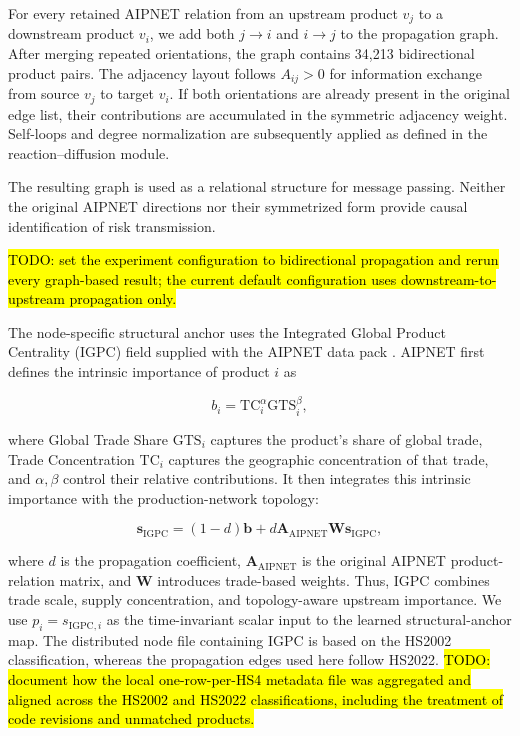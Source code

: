 \documentclass[letterpaper]{article} %
\begin{document}
For every retained AIPNET relation from an upstream product \(v_j\) to a downstream product \(v_i\), we add both \(j\!\rightarrow\! i\) and \(i\!\rightarrow\! j\) to the propagation graph. After merging repeated orientations, the graph contains 34,213 bidirectional product pairs. The adjacency layout follows \(A_{ij}>0\) for information exchange from source \(v_j\) to target \(v_i\). If both orientations are already present in the original edge list, their contributions are accumulated in the symmetric adjacency weight. Self-loops and degree normalization are subsequently applied as defined in the reaction--diffusion module.

The resulting graph is used as a relational structure for message passing. Neither the original AIPNET directions nor their symmetrized form provide causal identification of risk transmission.

\hl{TODO: set the experiment configuration to bidirectional propagation and rerun every graph-based result; the current default configuration uses downstream-to-upstream propagation only.}

The node-specific structural anchor uses the Integrated Global Product Centrality (IGPC) field supplied with the AIPNET data pack \cite{fetzer2024ai}. AIPNET first defines the intrinsic importance of product \(i\) as

\begin{equation}
b_i=\mathrm{TC}_i^{\alpha}\mathrm{GTS}_i^{\beta},
\label{eq:app-aipnet-intrinsic-importance}
\end{equation}

where Global Trade Share \(\mathrm{GTS}_i\) captures the product's share of global trade, Trade Concentration \(\mathrm{TC}_i\) captures the geographic concentration of that trade, and \(\alpha,\beta\) control their relative contributions. It then integrates this intrinsic importance with the production-network topology:

\begin{equation}
\mathbf s_{\mathrm{IGPC}}
=(1-d)\mathbf b
+d\mathbf A_{\mathrm{AIPNET}}\mathbf W\mathbf s_{\mathrm{IGPC}},
\label{eq:app-igpc}
\end{equation}

where \(d\) is the propagation coefficient, \(\mathbf A_{\mathrm{AIPNET}}\) is the original AIPNET product-relation matrix, and \(\mathbf W\) introduces trade-based weights. Thus, IGPC combines trade scale, supply concentration, and topology-aware upstream importance. We use \(p_i=s_{\mathrm{IGPC},i}\) as the time-invariant scalar input to the learned structural-anchor map. The distributed node file containing IGPC is based on the HS2002 classification, whereas the propagation edges used here follow HS2022. \hl{TODO: document how the local one-row-per-HS4 metadata file was aggregated and aligned across the HS2002 and HS2022 classifications, including the treatment of code revisions and unmatched products.}
\end{document}
